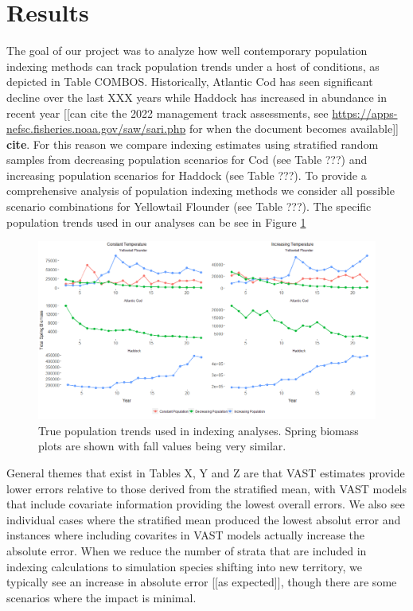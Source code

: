 \documentclass[
  12pt,
]{article}
\begin{document}
\section{Results}

The goal of our project was to analyze how well contemporary population indexing methods can track population trends under a host of conditions, as depicted in Table COMBOS. Historically, Atlantic Cod has seen significant decline over the last XXX years while Haddock has increased in abundance in recent year {[}{[}can cite the 2022 management track assessments, see \url{https://apps-nefsc.fisheries.noaa.gov/saw/sari.php} for when the document becomes available{]}{]} \textbf{cite}. For this reason we compare indexing estimates using stratified random samples from decreasing population scenarios for Cod (see Table ???) and increasing population scenarios for Haddock (see Table ???). To provide a comprehensive analysis of population indexing methods we consider all possible scenario combinations for Yellowtail Flounder (see Table ???). The specific population trends used in our analyses can be see in Figure \ref{fig:pop-scenarios}

\begin{figure}

{\centering \includegraphics[width=0.99\linewidth]{Images/Population_scenarios} 

}

\caption{True population trends used in indexing analyses. Spring biomass plots are shown with fall values being very similar.}\label{fig:pop-scenarios}
\end{figure}

General themes that exist in Tables X, Y and Z are that VAST estimates provide lower errors relative to those derived from the stratified mean, with VAST models that include covariate information providing the lowest overall errors. We also see individual cases where the stratified mean produced the lowest absolut error and instances where including covarites in VAST models actually increase the absolute error. When we reduce the number of strata that are included in indexing calculations to simulation species shifting into new territory, we typically see an increase in absolute error {[}{[}as expected{]}{]}, though there are some scenarios where the impact is minimal.
\end{document}
